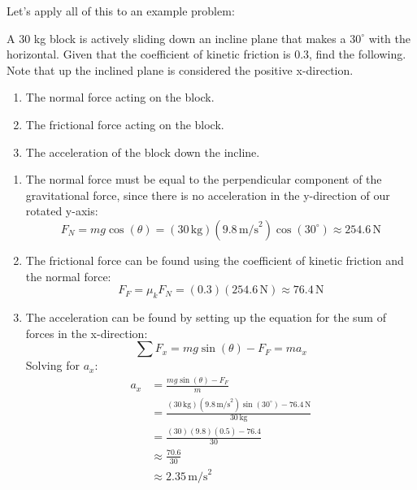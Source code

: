 Let's apply all of this to an example problem:
\begin{Exercise}[title=Box sliding down an incline, label=incline1]
    A 30 kg block is actively sliding down an incline plane that makes a $30^\circ$ with the horizontal. Given that the coefficient of kinetic friction is 0.3, find the following. Note that up the inclined plane is considered the positive x-direction.
    \begin{enumerate}[label=(\alph*)]
        \item The normal force acting on the block.
        \item The frictional force acting on the block.
        \item The acceleration of the block down the incline.
    \end{enumerate}
\end{Exercise}
\begin{Answer}[ref=incline1]
    \begin{enumerate}[label=(\alph*)]
        \item The normal force must be equal to the perpendicular component of the gravitational force, since there is no acceleration in the y-direction of our rotated y-axis:
        $$F_N = mg\cos(\theta) = (30\,\text{kg})(9.8\,\text{m/s}^2)\cos(30^\circ) \approx 254.6\,\text{N}$$
        \item The frictional force can be found using the coefficient of kinetic friction and the normal force:
        $$F_F = \mu_k F_N = (0.3)(254.6\,\text{N}) \approx 76.4\,\text{N}$$
        \item The acceleration can be found by setting up the equation for the sum of forces in the x-direction:
        $$\sum F_x = mg\sin(\theta) - F_F = ma_x$$
        Solving for $a_x$:
        \begin{align*}
            a_x &= \frac{mg\sin(\theta) - F_F}{m} \\
            &= \frac{(30\,\text{kg})(9.8\,\text{m/s}^2)\sin(30^\circ) - 76.4\,\text{N}}{30\,\text{kg}} \\
            &= \frac{(30)(9.8)(0.5) - 76.4}{30} \\
            &\approx \frac{70.6}{30} \\
            &\approx 2.35\,\text{m/s}^2 
        \end{align*}
    \end{enumerate}
\end{Answer}

